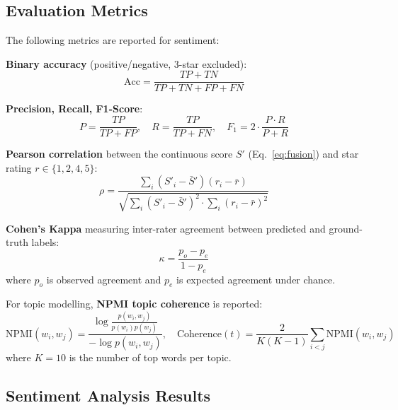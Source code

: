 \subsection{Evaluation Metrics}
\begin{justify}
The following metrics are reported for sentiment:

\textbf{Binary accuracy} (positive/negative, 3-star excluded):
\begin{equation}
    \text{Acc} = \frac{TP + TN}{TP + TN + FP + FN}
\end{equation}

\textbf{Precision, Recall, F1-Score}:
\begin{equation}
    P = \frac{TP}{TP + FP}, \quad R = \frac{TP}{TP + FN}, \quad F_1 = 2 \cdot \frac{P \cdot R}{P + R}
\end{equation}

\textbf{Pearson correlation} between the continuous score $S'$ (Eq.~\ref{eq:fusion}) and star rating $r \in \{1,2,4,5\}$:
\begin{equation}
    \rho = \frac{\sum_i (S'_i - \bar{S}')(r_i - \bar{r})}{\sqrt{\sum_i (S'_i - \bar{S}')^2 \cdot \sum_i (r_i - \bar{r})^2}}
\end{equation}

\textbf{Cohen's Kappa} measuring inter-rater agreement between predicted and ground-truth labels:
\begin{equation}
    \kappa = \frac{p_o - p_e}{1 - p_e}
\end{equation}
where $p_o$ is observed agreement and $p_e$ is expected agreement under chance.

For topic modelling, \textbf{NPMI topic coherence} is reported:
\begin{equation}
    \text{NPMI}(w_i, w_j) = \frac{\log \frac{p(w_i, w_j)}{p(w_i)p(w_j)}}{-\log p(w_i, w_j)}, \quad \text{Coherence}(t) = \frac{2}{K(K-1)} \sum_{i<j} \text{NPMI}(w_i, w_j)
\end{equation}
where $K = 10$ is the number of top words per topic.
\end{justify}

\subsection{Sentiment Analysis Results}
\label{sec:sentiment_results}

